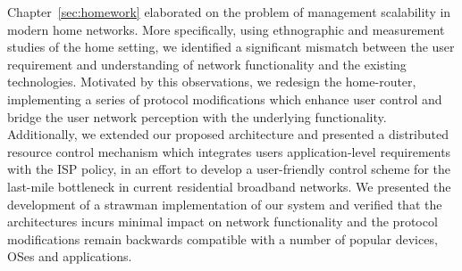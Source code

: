Chapter~\ref{sec:homework} elaborated on the problem of management scalability
in modern home networks. More specifically, using ethnographic and measurement
studies of the home setting, we identified a significant mismatch between the
user requirement and understanding of network functionality and the existing
technologies. Motivated by this observations, we redesign the home-router,
implementing a series of protocol modifications which enhance user control and
bridge the user network perception with the underlying functionality.
Additionally, we extended our proposed architecture and presented a distributed
resource control mechanism which integrates users application-level requirements
with the ISP policy, in an effort to develop a user-friendly control scheme for
the last-mile bottleneck in current residential broadband networks. We presented
the development of a strawman implementation of our system and verified that the
architectures incurs minimal impact on network functionality and the protocol
modifications remain backwards compatible with a number of popular devices,
OSes and applications.  

